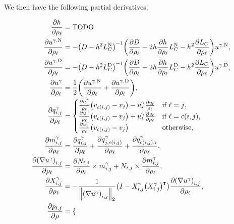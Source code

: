 We then have the following partial derivatives:

\begin{align*}
	\frac{\partial h}{\partial \rho_\ell} &= \text{TODO} \\
	\frac{\partial u^{\gamma, \text{N}}}{\partial \rho_\ell} &= -\pof{D - h^2L_C^{\text{N}}}^{-1}\pof{\frac{\partial D}{\partial \rho_\ell} - 2h\frac{\partial h}{\partial \rho_\ell}L_C^{\text{N}} - h^2\frac{\partial L_C}{\partial \rho_\ell}}u^{\gamma, \text{N}}, \\
	\frac{\partial u^{\gamma, \text{D}}}{\partial \rho_\ell} &= -\pof{D - h^2L_C^{\text{D}}}^{-1}\pof{\frac{\partial D}{\partial \rho_\ell} - 2h\frac{\partial h}{\partial \rho_\ell}L_C^{\text{D}} - h^2\frac{\partial L_C}{\partial \rho_\ell}}u^{\gamma, \text{D}}, \\
	\frac{\partial u^\gamma}{\partial \rho_\ell} &= \frac{1}{2}\pof{\frac{\partial u^{\gamma, \text{N}}}{\partial \rho_\ell} + \frac{\partial u^{\gamma, \text{D}}}{\partial \rho_\ell}}, \\
	\frac{\partial q^\gamma_{i, j}}{\partial \rho_\ell} &= \begin{cases}
		\frac{\partial u^\gamma_i}{\rho_\ell}\pof{v_{c\pof{i, j}} - v_j} - u^\gamma_i\frac{\partial v_\ell}{\rho_\ell} & \text{if \(\ell = j\)}, \\
		\frac{\partial u^\gamma_i}{\rho_\ell}\pof{v_{c\pof{i, j}} - v_j} + u^\gamma_i\frac{\partial v_\ell}{\partial \rho_\ell} & \text{if \(\ell = c\pof{i, j}\)}, \\
		\frac{\partial u^\gamma_i}{\rho_\ell}\pof{v_{c\pof{i, j}} - v_j} & \text{otherwise},
	\end{cases} \\
	\frac{\partial m^\gamma_{i, j}}{\partial \rho_\ell} &= \frac{\partial q^\gamma_{i, j}}{\partial \rho_\ell} + \frac{\partial q^\gamma_{j, c\pof{i, j}}}{\partial \rho_\ell} + \frac{\partial q^\gamma_{c\pof{i, j}, i}}{\partial \rho_\ell}, \\
	\frac{\partial \pof{\nabla u^\gamma}_{i, j}}{\partial \rho_\ell} &= \frac{\partial N_{i, j}}{\partial \rho_\ell} \times m^\gamma_{i, j} + N_{i, j} \times \frac{\partial m^\gamma_{i, j}}{\partial \rho_\ell}, \\
	\frac{\partial X^\gamma_{i, j}}{\partial \rho_\ell} &= -\frac{1}{\norm{\pof{\nabla u^\gamma}_{i, j}}_2}\pof{I - X^\gamma_{i, j}\pof{X^\gamma_{i, j}}^\intercal}\frac{\partial \pof{\nabla u^\gamma}_{i, j}}{\partial \rho_\ell}, \\
	\frac{\partial p_{i, j}}{\partial \rho} &= \begin{cases}

\end{cases}
\end{align*}

